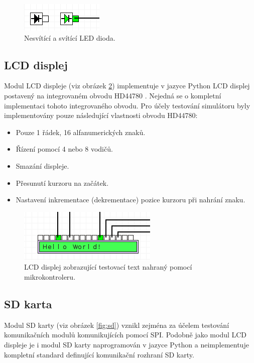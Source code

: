 \begin{figure}[ht]
\centering
\includegraphics[trim=0cm 0cm 0cm 0cm, scale=1]{fig/led}
\caption{Nesvítící a svítící LED dioda.}
\label{fig:dioda}
\end{figure}

\subsection{LCD displej}

Modul LCD displeje (viz obrázek \ref{fig:lcd}) implementuje v jazyce Python LCD displej postavený na integrovaném obvodu HD44780 \cite{hd44780}. Nejedná se o kompletní implementaci tohoto integrovaného obvodu. Pro účely testování simulátoru byly implementovány pouze následující vlastnosti obvodu HD44780:

\begin{itemize}
\item Pouze 1 řádek, 16 alfanumerických znaků.
\item Řízení pomocí 4 nebo 8 vodičů.
\item Smazání displeje.
\item Přesunutí kurzoru na začátek.
\item Nastavení inkrementace (dekrementace) pozice kurzoru při nahrání znaku.
\end{itemize}

\begin{figure}[ht]
\centering
\includegraphics[trim=0cm 0cm 0cm 0cm, scale=1]{fig/lcd}
\caption{LCD displej zobrazující testovací text nahraný pomocí mikrokontroleru.}
\label{fig:lcd}
\end{figure}

\subsection{SD karta}

Modul SD karty (viz obrázek \ref{fig:sd}) vznikl zejména za účelem testování komunikačních modulů komunikujících pomocí SPI. Podobně jako modul LCD displeje je i modul SD karty naprogramován v jazyce Python a neimplementuje kompletní standard \cite{sdio} definující komunikační rozhraní SD karty.

